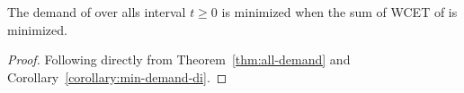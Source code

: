 \begin{corollary}
  \label{corollary:min-wcet-di}
  The demand of  over alls interval ${t \ge 0}$ is
  minimized when the sum of WCET of  is minimized.
\begin{proof} Following directly from
  Theorem~\ref{thm:all-demand} and Corollary~\ref{corollary:min-demand-di}.
\end{proof}

\end{corollary}

